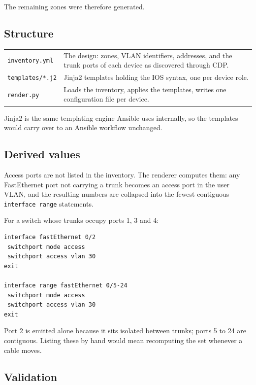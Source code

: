 \documentclass[12pt,a4paper]{article}
\begin{document}
The remaining zones were therefore generated.

\subsection{Structure}

\begin{table}[H]
\centering
\begin{tabular}{@{} l p{8.5cm} @{}}
\toprule
\texttt{inventory.yml} & The design: zones, VLAN identifiers, addresses, and the
  trunk ports of each device as discovered through CDP. \\
\texttt{templates/*.j2} & Jinja2 templates holding the IOS syntax, one per device
  role. \\
\texttt{render.py} & Loads the inventory, applies the templates, writes one
  configuration file per device. \\
\bottomrule
\end{tabular}
\end{table}

Jinja2 is the same templating engine Ansible uses internally, so the templates
would carry over to an Ansible workflow unchanged.

\subsection{Derived values}

Access ports are not listed in the inventory. The renderer computes them: any
FastEthernet port not carrying a trunk becomes an access port in the user VLAN,
and the resulting numbers are collapsed into the fewest contiguous
\texttt{interface range} statements.

For a switch whose trunks occupy ports 1, 3 and 4:

\begin{lstlisting}
interface fastEthernet 0/2
 switchport mode access
 switchport access vlan 30
exit

interface range fastEthernet 0/5-24
 switchport mode access
 switchport access vlan 30
exit
\end{lstlisting}

Port 2 is emitted alone because it sits isolated between trunks; ports 5 to 24
are contiguous. Listing these by hand would mean recomputing the set whenever a
cable moves.

\subsection{Validation}
\end{document}
